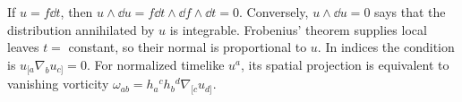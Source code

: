 \begin{enumerate}[leftmargin=2.8em,itemsep=1.2em]
If \(u=f\dd t\), then \(u\wedge\dd u=f\dd t\wedge\dd f\wedge\dd t=0\).
Conversely, \(u\wedge\dd u=0\) says that the distribution annihilated by
\(u\) is integrable.  Frobenius' theorem supplies local leaves \(t=\) constant,
so their normal is proportional to \(u\).  In indices the condition is
\(u_{[a}\nabla_bu_{c]}=0\).  For normalized timelike \(u^a\), its spatial
projection is equivalent to vanishing vorticity
\(\omega_{ab}=h_a{}^ch_b{}^d\nabla_{[c}u_{d]}\).
\end{enumerate}
